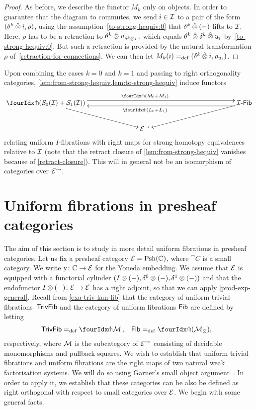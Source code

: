 \documentclass[reqno,10pt,a4paper,oneside,draft]{amsart}
\begin{document}
\begin{proof}
As before, we describe the functor $M_k$ only on objects.
In order to guarantee that the diagram to commutes, we send $i \in \cal{I}$ to a pair of the form $(\kcyl \hatotimes i, \rho)$, using the assumption~\eqref{to-strong-hequiv:0} that $\kcyl \hatotimes (-)$ lifts to $\cal{I}$.
Here, $\rho$ has to be a retraction to $\thetak \hatotimes u_{\kcyl \hatotimes i}\, ,$ which equals $\thetak \hatotimes \kcyl \hatotimes u_i$ by~\eqref{to-strong-hequiv:0}.
But such a retraction is provided by the natural transformation $\rho$ of~\cref{retraction-for-connections}.
We can then let $M_k(i) \defeq (\kcyl \hatotimes i, \rho_{u_i})$.
\end{proof}

\begin{remark} \label{relating-strong-hequiv-and-uniform-fib}
Upon combining the cases $k = 0$ and $k = 1$ and passing to right orthogonality categories, \cref{lem:from-strong-hequiv,lem:to-strong-hequiv} induce functors
\[
\xymatrix@!C{
  \liftr{(\cal{S}_0(\cal{I}) + \cal{S}_1(\cal{I}))}
  \ar[dr]
  \ar@<4pt>[rr]^{\liftr{(M_0 + M_1)}}
&&
  \Fib[\cal{I}]
  \ar[dl]
  \ar@<4pt>[ll]^{\liftr{(L_0 + L_1)}}
\\&
  \catE^\to
}
\]
relating uniform $I$-fibrations with right maps for strong homotopy equivalences relative to $\cal{I}$ (note that the retract closure of \cref{lem:from-strong-hequiv} vanishes because of \cref{retract-closure}).
This will in general not be an isomorphism of categories over $\catE^\to$.
\end{remark}


\section{Uniform fibrations in presheaf categories}
\label{sec:unifpc}

The aim of this section is to study in more detail uniform fibrations in presheaf categories.
Let us fix a presheaf category $\catE = \Psh(\cat{C})$, where $\cat{C}$ is a small category.
We write $\yon \co \catC \to \catE$ for the Yoneda embedding.
We assume that $\catE$ is equipped with a functorial cylinder $( \interval \otimes (-), \lcyl \otimes (-), \rcyl \otimes (-))$ and that the endofunctor $ \interval\otimes (-) \co \catE \to \catE$ has a right adjoint, so that we can apply \cref{prod-exp-general}.
Recall from \cref{exa-triv-kan-fib} that the category of uniform trivial fibrations~$\TrivFib$ and the category of uniform fibrations $\Fib$ are defined by letting
\[
\begin{aligned}
  \TrivFib &\defeq \liftr{\cal{M}}
\, ,&
  \Fib &\defeq \liftr{(\cal{M}_\otimes)}
\rlap{,}
\end{aligned}
\]
respectively, where $\cal{M}$ is the subcategory of $\catE^\to$ consisting of decidable monomorphisms and pullback squares.
We wish to establish that uniform trivial fibrations and uniform fibrations are the right maps of two natural weak factorisation systems.
We will do so using Garner's small object argument~\cite{garner:small-object-argument}.
In order to apply it, we establish that these categories can be also be defined as right orthogonal with respect to small categories over $\catE$.
We begin with some general facts.
\end{document}
